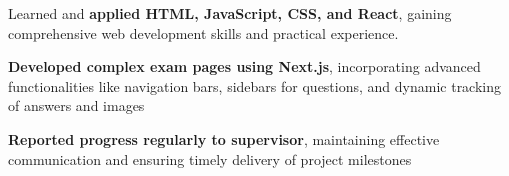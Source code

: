 \documentclass[../main.tex]{subfiles}
\begin{document}
        \vspace{0.10 cm}
        \begin{onecolentry}
            \begin{highlights}
            \item Learned and \textbf{applied HTML, JavaScript, CSS, and React}, gaining comprehensive web development skills and practical experience.
            \item \textbf{Developed complex exam pages using Next.js}, incorporating advanced functionalities like navigation bars, sidebars for questions, and dynamic tracking of answers and images
            \item \textbf{Reported progress regularly to supervisor}, maintaining effective communication and ensuring timely delivery of project milestones
            \end{highlights}
        \end{onecolentry}
\end{document}
